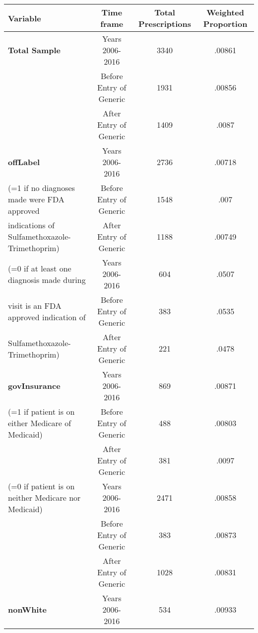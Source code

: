 \begin{tabular}{l*{3}{c}}
\hline\hline
            Variable&\multicolumn{1}{c}{Time frame}&\multicolumn{1}{c}{Total Prescriptions}&\multicolumn{1}{c}{Weighted Proportion}\\
\hline
\textbf{Total Sample}                                   &     Years 2006-2016&                          3340&     .00861\\
                                                        &     Before Entry of Generic&    1931&     .00856\\
                                                        &     After Entry of Generic&      1409&     .0087\\
[1em]
\textbf{offLabel}                                       &     Years 2006-2016&             2736&     .00718\\
(=1 if no diagnoses made were FDA approved         &     Before Entry of Generic&    1548&     .007\\
indications of Sulfamethoxazole-Trimethoprim)  &     After Entry of Generic&      1188&     .00749\\
[1em]
(=0 if at least one diagnosis made during               &     Years 2006-2016&             604&     .0507\\
visit is an FDA approved indication of                  &     Before Entry of Generic&    383&     .0535\\
Sulfamethoxazole-Trimethoprim)                          &     After Entry of Generic&      221&     .0478\\
[1em]
\textbf{govInsurance}                                   &     Years 2006-2016&             869&     .00871\\
(=1 if patient is on either Medicare of Medicaid)       &     Before Entry of Generic&     488 &     .00803\\
                                                        &     After Entry of Generic&      381 &     .0097\\
[1em]
(=0 if patient is on neither Medicare nor Medicaid)     &     Years 2006-2016&             2471&     .00858\\
                                                        &     Before Entry of Generic&     383 &     .00873\\
                                                        &     After Entry of Generic&      1028 &     .00831\\
[1em]
\textbf{nonWhite}                                       &     Years 2006-2016&             534&      .00933\\

\end{tabular}
